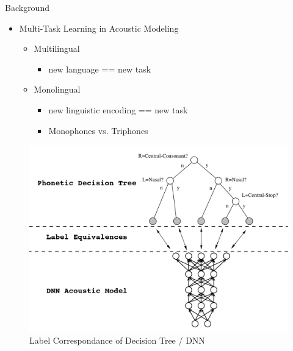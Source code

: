 \documentclass[final]{beamer} %
\begin{document}
\begin{frame}
\begin{columns}
\begin{column}{0.3\textwidth}
{        \vspace{.5cm}

        \begin{block}{\boxnumber Background}
          \begin{itemize}
          \item Multi-Task Learning in Acoustic Modeling
            \begin{itemize}
            \item Multilingual
              \begin{itemize}
              \item new language == new task
              \end{itemize}
            \item Monolingual
              \begin{itemize}
              \item new linguistic encoding == new task
                \item Monophones vs. Triphones
              \end{itemize}
            \end{itemize}     
          \end{itemize}
        \end{block}
        \vspace{.5cm}

        \vspace{.5cm}

        \begin{figure}[!htbp]
          \centering
          \includegraphics[width=\linewidth]{figs/tree-net.png}
          \caption{Label Correspondance of Decision Tree / DNN }
          \label{fig:mtl-dnn}
          \endminipage\hfill
        \end{figure}

}
\end{column}
\end{columns}
\end{frame}
\end{document}
